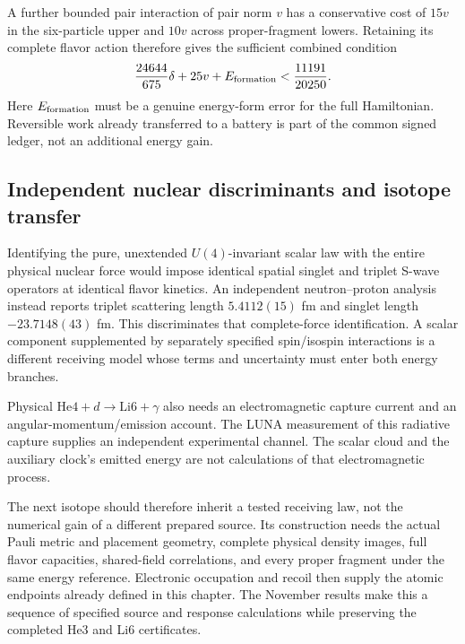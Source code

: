A further bounded pair interaction of pair norm $v$ has a conservative
cost of $15v$ in the six-particle upper and $10v$ across proper-fragment
lowers. Retaining its complete flavor action therefore gives the sufficient
combined condition
\begin{equation}
\frac{24644}{675}\delta+25v+E_{\rm formation}
<\frac{11191}{20250}.
\end{equation}
Here $E_{\rm formation}$ must be a genuine energy-form error for the full
Hamiltonian. Reversible work already transferred to a battery is part of
the common signed ledger, not an additional energy gain.

\subsection{Independent nuclear discriminants and isotope transfer}

Identifying the pure, unextended $U(4)$-invariant scalar law with the entire
physical nuclear force would impose identical spatial singlet and triplet
S-wave operators at identical flavor kinetics. An independent
neutron--proton analysis instead reports triplet scattering length
$5.4112(15)$ fm and singlet length $-23.7148(43)$ fm. This discriminates
that complete-force identification. A scalar component supplemented by
separately specified spin/isospin interactions is a different receiving
model whose terms and uncertainty must enter both energy branches.

Physical $\mathrm{He4}+d\to\mathrm{Li6}+\gamma$ also needs an
electromagnetic capture current and an angular-momentum/emission account.
The LUNA measurement of this radiative capture supplies an independent
experimental channel. The scalar cloud and the auxiliary clock's emitted
energy are not calculations of that electromagnetic process.

The next isotope should therefore inherit a tested receiving law, not the
numerical gain of a different prepared source. Its construction needs the
actual Pauli metric and placement geometry, complete physical density
images, full flavor capacities, shared-field correlations, and every proper
fragment under the same energy reference. Electronic occupation and recoil
then supply the atomic endpoints already defined in this chapter. The
November results make this a sequence of specified source and response
calculations while preserving the completed He3 and Li6 certificates.
